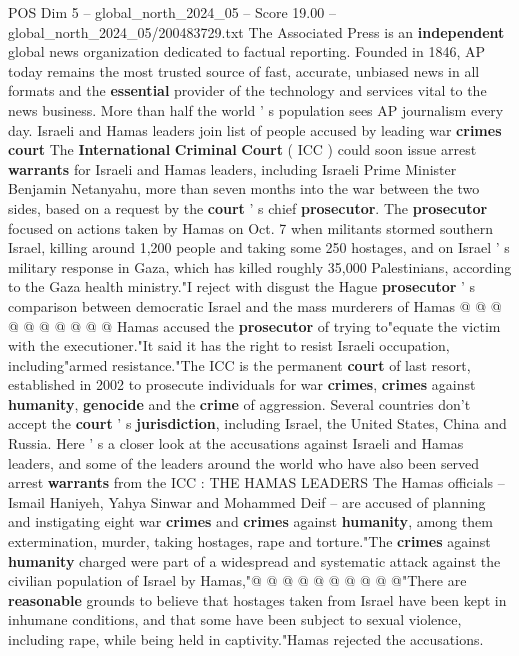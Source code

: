 \begin{textsample}{POS Dim 5 – global\_north\_2024\_05 – Score 19.00 – global\_north\_2024\_05/200483729.txt}  \label{ex:f5_pos_167}
The Associated Press is an \textbf{independent} global news organization dedicated to factual reporting.
Founded in 1846, AP today remains the most trusted source of fast, accurate, unbiased news in all formats and the \textbf{essential} provider of the technology and services vital to the news business.
More than half the world ' s population sees AP journalism every day.
Israeli and Hamas leaders join list of people accused by leading war \textbf{crimes} \textbf{court} The \textbf{International} \textbf{Criminal} \textbf{Court} ( ICC ) could soon issue arrest \textbf{warrants} for Israeli and Hamas leaders, including Israeli Prime Minister Benjamin Netanyahu, more than seven months into the war between the two sides, based on a request by the \textbf{court} ' s chief \textbf{prosecutor}.
The \textbf{prosecutor} focused on actions taken by Hamas on Oct. 7 when militants stormed southern Israel, killing around 1,200 people and taking some 250 hostages, and on Israel ' s military response in Gaza, which has killed roughly 35,000 Palestinians, according to the Gaza health ministry."I reject with disgust the Hague \textbf{prosecutor} ' s comparison between democratic Israel and the mass murderers of Hamas @ @ @ @ @ @ @ @ @ @ Hamas accused the \textbf{prosecutor} of trying to"equate the victim with the executioner."It said it has the right to resist Israeli occupation, including"armed resistance."The ICC is the permanent \textbf{court} of last resort, established in 2002 to prosecute individuals for war \textbf{crimes}, \textbf{crimes} against \textbf{humanity}, \textbf{genocide} and the \textbf{crime} of aggression.
Several countries don't accept the \textbf{court} ' s \textbf{jurisdiction}, including Israel, the United States, China and Russia.
Here ' s a closer look at the accusations against Israeli and Hamas leaders, and some of the leaders around the world who have also been served arrest \textbf{warrants} from the ICC : THE HAMAS LEADERS The Hamas officials -- Ismail Haniyeh, Yahya Sinwar and Mohammed Deif -- are accused of planning and instigating eight war \textbf{crimes} and \textbf{crimes} against \textbf{humanity}, among them extermination, murder, taking hostages, rape and torture."The \textbf{crimes} against \textbf{humanity} charged were part of a widespread and systematic attack against the civilian population of Israel by Hamas,"@ @ @ @ @ @ @ @ @ @"There are \textbf{reasonable} grounds to believe that hostages taken from Israel have been kept in inhumane conditions, and that some have been subject to sexual violence, including rape, while being held in captivity."Hamas rejected the accusations.

\end{textsample}
